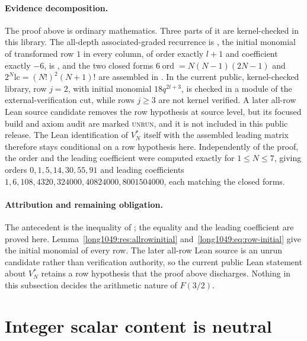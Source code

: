 \paragraph{Evidence decomposition.}
The proof above is ordinary mathematics.  Three parts of it are kernel-checked
in this library.  The all-depth
associated-graded recurrence is
,
the initial monomial of transformed row $1$ in every column, of order exactly
$l+1$ and coefficient exactly $-6$, is
,
and the two closed forms $6\operatorname{ord}=N(N-1)(2N-1)$ and
$2^{N}\mathrm{lc}=(N!)^{2}(N+1)!$ are assembled in
.  In the current public, kernel-checked library, row $j=2$,
with initial monomial $18q^{2l+3}$, is checked in a module of the
external-verification cut, while rows $j\ge3$ are not kernel verified.  A later
all-row Lean source candidate removes the row hypothesis at source level, but
its focused build and axiom audit are marked \textsc{unrun}, and it is not
included in this public release.  The Lean identification of $V_N^{*}$ itself
with the assembled leading matrix therefore stays conditional on a row
hypothesis here.  Independently of the proof, the order and the
leading coefficient were computed exactly for $1\le N\le7$, giving orders
$0,1,5,14,30,55,91$ and leading coefficients
$1,6,108,4320,324000,40824000,8001504000$, each matching the closed forms.

\paragraph{Attribution and remaining obligation.}
The antecedent is the inequality of \cite[Sec.~4]{zudilin2016}; the equality and
the leading coefficient are proved here.  Lemma~\ref{long1049:res:allrowinitial}
and~\eqref{long1049:eq:row-initial} give the initial monomial of every row.  The
later all-row Lean source is an unrun candidate rather than verification
authority, so the current public Lean statement about $V_N^{*}$ retains a row
hypothesis that the proof above discharges.  Nothing in this subsection decides
the arithmetic nature of $F(3/2)$.

\section{Integer scalar content is neutral}\label{long1049:sec:primitive}

